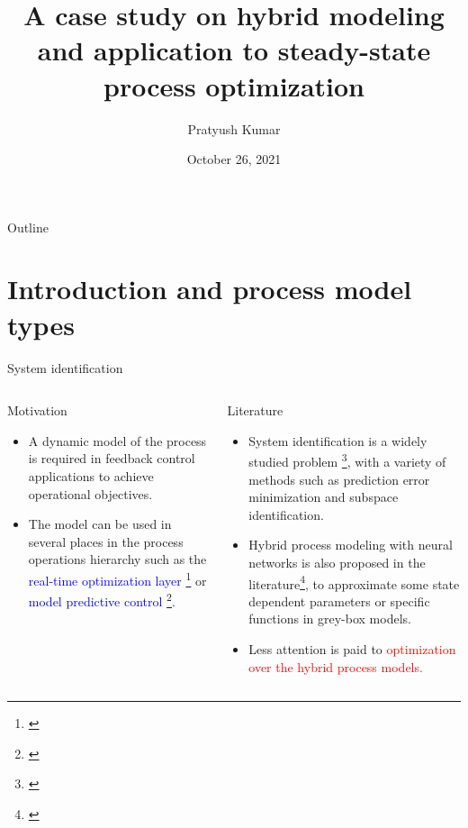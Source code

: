 \documentclass[xcolor=dvipsnames, 8pt]{beamer} %
\title{A case study on hybrid modeling and application to steady-state 
process optimization}
\date{October 26, 2021}
\author[Pratyush Kumar]{\large Pratyush Kumar}
\institute[UCSB]{
	\begin{minipage}{4in}
		\vspace{-10pt}
		\centering
		\raisebox{-0.1\height}{\texttt{[image: UCSB\_seal]}}
	\end{minipage}
	\vspace{10pt}
	\newline
	{\large Department of chemical engineering}
	\vspace{10pt}
	\newline
	{\large Group meeting presentation}}
\begin{document}
\frame{\titlepage}


\begin{frame}{Outline} 
	\tableofcontents 
\end{frame}

\section{Introduction and process model types}
\begin{frame}{System identification}

	\begin{columns}
	\column{\textwidth}

	\begin{block}{Motivation}
		\begin{itemize}
	\item A dynamic model of the process is required in feedback
		control applications to achieve operational objectives. \pause
	\medskip
	\item The model can be used in several places in the process operations 
	hierarchy such as the \textcolor{blue}{real-time optimization layer} 
		\footnote[frame]{\cite{darby:nikolaou:jones:nicholson:2011}} or 
	\textcolor{blue}{model predictive control} 
	\footnote[frame]{\cite{qin:badgwell:2003, 
	lahiri:2017}}.
	\end{itemize}
	\end{block}
	  \pause
	  \bigskip
	\begin{block}{Literature}
	  \begin{itemize}
	  \item System identification is a widely studied problem 
	  \footnote[frame]{\cite{ljung:1999, qin:2006}}, with a variety of methods 
	  such as prediction error minimization and subspace identification.
	  \medskip
	  \item Hybrid process modeling with neural networks is also proposed in 
	 the literature\footnote[frame]{\cite{psichogios:ungar:1992, 
	 lovelett:avalos:kevrekidis:2019, chen:ierapetritou:2020, 
	 bangi:kwon:2020}}, 
	 to approximate some state dependent parameters or 
	 specific functions in grey-box models.	
	  \item Less attention is paid to \textcolor{red}{optimization over the 
	  hybrid process models.} 
	  \end{itemize}
	\end{block}
  
\end{columns}
\end{frame}
	
\end{document}

